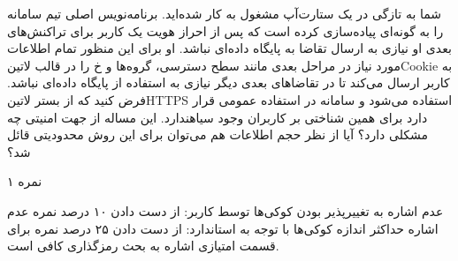 \documentclass[../main.tex]{subfiles}
\begin{document}

شما به تازگی در یک ستارت‌آپ مشغول به کار شده‌اید.
برنامه‌نویس اصلی تیم سامانه را به گونه‌ای پیاده‌سازی کرده است که پس از احراز هویت یک کاربر
برای تراکنش‌های بعدی او نیازی به ارسال تقاضا به پایگاه داده‌ای نباشد.
او برای این منظور تمام اطلاعات مورد نیاز در مراحل بعدی مانند سطح دسترسی، گروه‌ها و ‌خ را در قالب ‌لاتین{Cookie}
به کاربر ارسال می‌کند تا در تقاضاهای بعدی دیگر نیازی به استفاده از پایگاه داده‌ای نباشد.
فرض کنید که از بستر ‌لاتین{HTTPS} استفاده می‌شود و سامانه در استفاده عمومی قرار دارد برای همین شناختی بر کاربران وجود ‌سیاه{ندارد}.
این مساله از جهت امنیتی چه مشکلی دارد؟
آیا از نظر حجم اطلاعات هم می‌توان برای این روش محدودیتی قائل شد؟

۱ نمره

 عدم اشاره به تغییرپذیر بودن کوکی‌ها توسط کاربر: از دست دادن ۱۰ درصد نمره
 عدم اشاره حداکثر اندازه کوکی‌ها با توجه به استاندارد: از دست دادن ۲۵ درصد نمره
 برای قسمت امتیازی اشاره به بحث رمزگذاری کافی است.
\end{document}
